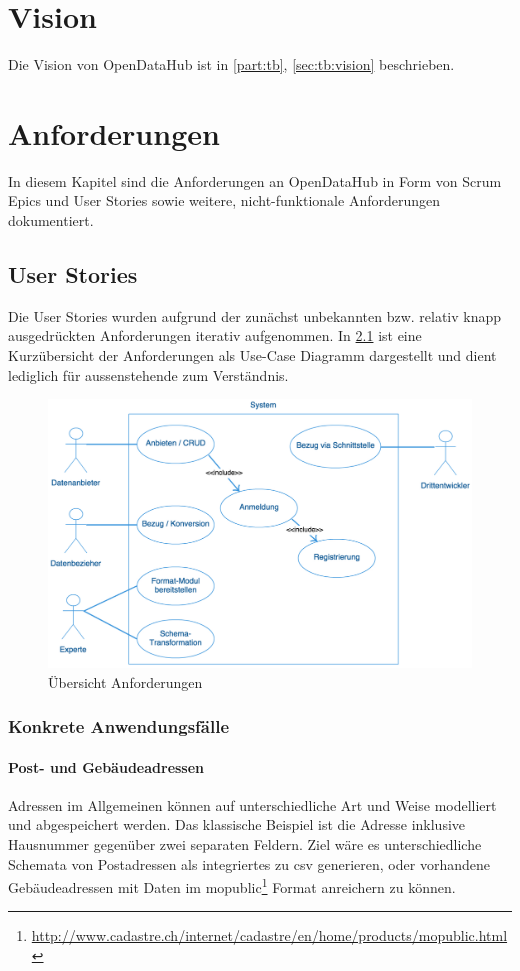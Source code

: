 \chapter{Vision}
Die Vision von OpenDataHub ist in \cref{part:tb}, \vref{sec:tb:vision} beschrieben.


\chapter{Anforderungen}
In diesem Kapitel sind die Anforderungen an OpenDataHub in Form von Scrum Epics und User Stories sowie weitere, nicht-funktionale Anforderungen dokumentiert.


\section{User Stories}\label{sec:pd:user-stories}

Die User Stories wurden aufgrund der zunächst unbekannten bzw. relativ knapp ausgedrückten Anforderungen iterativ aufgenommen. In \cref{fig:pd:uc-diagramm} ist eine Kurzübersicht der Anforderungen als Use-Case Diagramm dargestellt und dient lediglich für aussenstehende zum Verständnis.

\begin{figure}[H]
	\centering
	\includegraphics[width=0.9\linewidth]{fig/uc-diagramm}
	\caption{Übersicht Anforderungen}
	\label{fig:pd:uc-diagramm}
\end{figure}

\subsection{Konkrete Anwendungsfälle}
\label{sec:pd:usecases}

\subsubsection{Post- und Gebäudeadressen}
Adressen im Allgemeinen können auf unterschiedliche Art und Weise modelliert und abgespeichert werden. Das klassische Beispiel ist die Adresse inklusive Hausnummer gegenüber zwei separaten Feldern. Ziel wäre es unterschiedliche Schemata von Postadressen als integriertes zu \acs{csv} generieren, oder vorhandene Gebäudeadressen mit Daten im \gls{mopublic}\footnote{\url{http://www.cadastre.ch/internet/cadastre/en/home/products/mopublic.html}} Format anreichern zu können.

